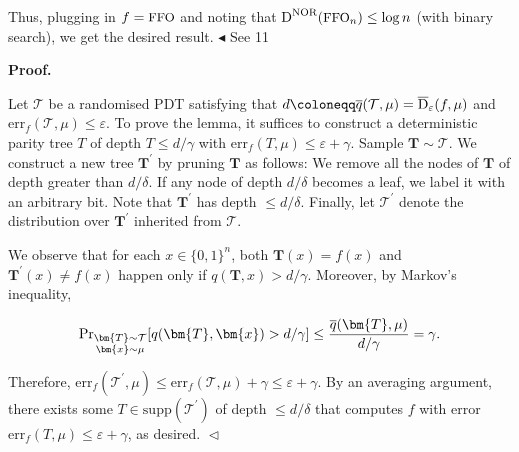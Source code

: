 \documentclass[10pt,a4paper]{article}
\begin{document}
Thus, plugging in $f={\textrm{\small{FFO}}}$ and noting that ${\textup{D}}^{{\textrm{\small{\scriptsize NOR}}}}({\textrm{\small{FFO}}}_{n})\leq\log n$ (with binary search), we get the desired result.
$\blacktriangleleft$
See 11\par





\par\medskip\noindent\textbf{
\textbf{Proof}.}\par




Let $\mathcal{T}$ be a randomised PDT satisfying that $d\coloneqq\overline{q}(\mathcal{T},\mu)=\overline{{\textup{D}}}_{\varepsilon}(f,\mu)$ and $\mathrm{err}_{f}(\mathcal{T},\mu)\leq\varepsilon$.
To prove the lemma, it suffices to construct a deterministic parity tree $T$ of depth $T\leq d/\gamma$ with $\mathrm{err}_{f}(T,\mu)\leq\varepsilon+\gamma$. Sample $\bm{T}\sim\mathcal{T}$. We construct a new tree $\bm{T}^{\prime}$ by pruning $\bm{T}$ as follows: We remove all the nodes of $\bm{T}$ of depth greater than $d/\delta$. If any node of depth $d/\delta$ becomes a leaf, we label it with an arbitrary bit. Note that $\bm{T}^{\prime}$ has depth $\leq d/\delta$. Finally, let $\mathcal{T}^{\prime}$ denote the distribution over $\bm{T}^{\prime}$ inherited from $\mathcal{T}$.\par




We observe that for each $x\in\{0,1\}^{n}$, both $\bm{T}(x)=f(x)$ and $\bm{T}^{\prime}(x)\neq f(x)$ happen only if $q(\bm{T},x)>d/\gamma$. Moreover, by Markov’s inequality,\par


\[\begin{gathered}
\Pr\nolimits_{\begin{subarray}{c}\bm{T}\sim\mathcal{T}\\
\bm{x}\sim\mu\end{subarray}}[q(\bm{T},\bm{x})>d/\gamma]\leq\frac{\overline{q}(\bm{T},\mu)}{d/\gamma}=\gamma.
\end{gathered}\]


Therefore, $\mathrm{err}_{f}(\mathcal{T}^{\prime},\mu)\leq\mathrm{err}_{f}(\mathcal{T},\mu)+\gamma\leq\varepsilon+\gamma$. By an averaging argument, there exists some $T\in\mathrm{supp}(\mathcal{T}^{\prime})$ of depth $\leq d/\delta$ that computes $f$ with error $\mathrm{err}_{f}(T,\mu)\leq\varepsilon+\gamma$, as desired.
$\vartriangleleft$\par
\end{document}
